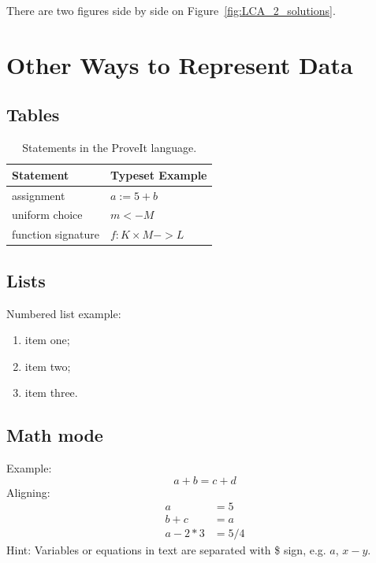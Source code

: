 \documentclass[12pt]{article}
\newcommand{\proveit}{ProveIt\xspace}
\begin{document}
There are two figures side by side on Figure~\ref{fig:LCA_2_solutions}.



\clearpage %
\section{Other Ways to Represent Data}

\subsection{Tables}

\begin{table}[h]
\centering
\caption{Statements in the \proveit language.}
\begin{tabular}{| l | l |}
	\hline
	\bf{Statement} & \bf{Typeset Example} \\
	\hline
	assignment & $a := 5 + b$ \\
	\hline
	uniform choice & $m <- M$ \\
	\hline
	function signature & $f : K \times M -> L$\\
	\hline
\end{tabular}
\label{tab:statements}
\end{table}


\subsection{Lists}

Numbered list example:
\begin{enumerate}
	\item item one; 
	\item item two;
	\item item three.
\end{enumerate} 

\subsection{Math mode}
Example:
\begin{equation}
a + b = c + d
\end{equation}
Aligning:
\begin{align*}
	a &= 5 \\
	b + c &= a \\
	a -2*3 &= 5/4
\end{align*}
Hint: Variables or equations in text are separated with \$ sign, e.g. $a$, $x - y$.
\end{document}
